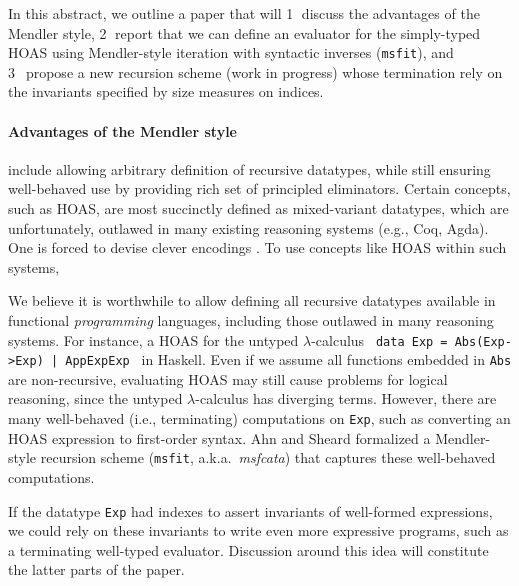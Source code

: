 \documentclass[a4paper]{easychair} %
\newcommand{\eg}[0]{{e.g.}}
\newcommand{\ie}[0]{{i.e.}}
\newcommand{\aka}[0]{{a.k.a.}}
\newcommand{\msfit}[0]{\texttt{msfit}}
\begin{document}
In this abstract, we outline a paper
that will
\textcircled{1} discuss the advantages of the Mendler style,
\textcircled{2} report that we can define an evaluator for the simply-typed HOAS
using Mendler-style iteration with syntactic inverses (\msfit), and
\textcircled{3}~propose a new recursion scheme (work in progress) whose
termination rely on the invariants specified by size measures on indices.
\vspace*{-2ex}
\paragraph{Advantages of the Mendler style\!\!\!}
include allowing arbitrary definition of recursive datatypes, while still 
ensuring well-behaved use by providing rich set of principled eliminators.
Certain concepts, such as HOAS, are most succinctly defined as
mixed-variant datatypes, which are unfortunately, outlawed in
many existing reasoning systems (\eg, Coq, Agda).
One is forced to devise clever encodings \cite{PHOAS}.
To use concepts like HOAS within such systems,

We believe it is worthwhile to allow defining all recursive datatypes
available in functional \emph{programming} languages, including those outlawed
in many reasoning systems. For instance, a HOAS for the untyped $\lambda$-calculus
{\small\texttt{\,data Exp~=~Abs\;(Exp\;->\;Exp)~|~App\;Exp\;Exp\,}} in Haskell.
Even if we assume all functions embedded in \texttt{Abs} are non-recursive,
evaluating HOAS may still cause problems for logical reasoning,
since the untyped $\lambda$-calculus has diverging terms. However, there are
many well-behaved (\ie, terminating) computations on \texttt{Exp}, such as
converting an HOAS expression to first-order syntax.
Ahn and Sheard \cite{AhnShe11} formalized a Mendler-style recursion scheme
(\msfit, \aka\ \textit{msfcata}) that captures these well-behaved computations.

If the datatype \texttt{Exp} had indexes to assert invariants of
well-formed expressions, we could rely on these invariants to write
even more expressive programs, such as a terminating well-typed evaluator.
Discussion around this idea will constitute the latter parts of the paper.
\vspace*{-2ex}
\end{document}

